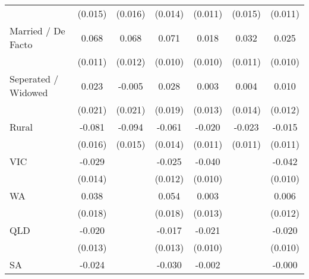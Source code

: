 {\begin{tabular}{l*{6}{c}}
                    &     (0.015)         &     (0.016)         &     (0.014)         &     (0.011)         &     (0.015)         &     (0.011)         \\
Married / De Facto  &       0.068\sym{***}&       0.068\sym{***}&       0.071\sym{***}&       0.018\sym{*}  &       0.032\sym{***}&       0.025\sym{***}\\
                    &     (0.011)         &     (0.012)         &     (0.010)         &     (0.010)         &     (0.011)         &     (0.010)         \\
Seperated / Widowed &       0.023         &      -0.005         &       0.028         &       0.003         &       0.004         &       0.010         \\
                    &     (0.021)         &     (0.021)         &     (0.019)         &     (0.013)         &     (0.014)         &     (0.012)         \\
Rural               &      -0.081\sym{***}&      -0.094\sym{***}&      -0.061\sym{***}&      -0.020\sym{*}  &      -0.023\sym{**} &      -0.015         \\
                    &     (0.016)         &     (0.015)         &     (0.014)         &     (0.011)         &     (0.011)         &     (0.011)         \\
VIC                 &      -0.029\sym{**} &                     &      -0.025\sym{**} &      -0.040\sym{***}&                     &      -0.042\sym{***}\\
                    &     (0.014)         &                     &     (0.012)         &     (0.010)         &                     &     (0.010)         \\
WA                  &       0.038\sym{**} &                     &       0.054\sym{***}&       0.003         &                     &       0.006         \\
                    &     (0.018)         &                     &     (0.018)         &     (0.013)         &                     &     (0.012)         \\
QLD                 &      -0.020         &                     &      -0.017         &      -0.021\sym{**} &                     &      -0.020\sym{**} \\
                    &     (0.013)         &                     &     (0.013)         &     (0.010)         &                     &     (0.010)         \\
SA                  &      -0.024\sym{*}  &                     &      -0.030\sym{**} &      -0.002         &                     &      -0.000         \\

\end{tabular}}
